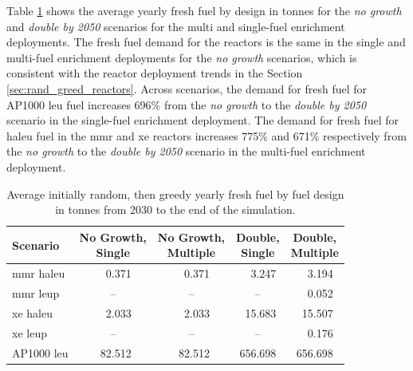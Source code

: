 Table \ref{tab:rand_greed_fresh_avg} shows the average yearly fresh fuel by design in tonnes for the \textit{no growth} and \textit{double by 2050} scenarios for the multi and single-fuel enrichment deployments. The fresh fuel demand for the reactors is the same in the single and multi-fuel enrichment deployments for the \textit{no growth} scenarios, which is consistent with the reactor deployment trends in the Section \ref{sec:rand_greed_reactors}. Across scenarios, the demand for fresh fuel for AP1000 \gls{leu} fuel increases 696\% from the \textit{no growth} to the \textit{double by 2050} scenario in the single-fuel enrichment deployment. The demand for fresh fuel for \gls{haleu} fuel in the \gls{mmr} and \gls{xe} reactors increases 775\% and 671\% respectively from the \textit{no growth} to the \textit{double by 2050} scenario in the multi-fuel enrichment deployment.

\begin{table}[H]
    \centering
    \caption{Average initially random, then greedy yearly fresh fuel by fuel design in tonnes from 2030 to the end of the simulation.}
    \label{tab:rand_greed_fresh_avg}
    \begin{tabular}{l c c c c}
       \toprule
       Scenario & \shortstack{No Growth,\\ Single} & \shortstack{No Growth,\\ Multiple} & \shortstack{Double,\\ Single} & \shortstack{Double,\\ Multiple}  \\
       \midrule
       \gls{mmr} \gls{haleu}   & \textcolor{white}{00}0.371    & \textcolor{white}{00}0.371   & \textcolor{white}{00}3.247    & \textcolor{white}{00}3.194    \\
       \gls{mmr} \gls{leup}    & --       & --      & --       & \textcolor{white}{00}0.052    \\
       \gls{xe} \gls{haleu}    & \textcolor{white}{00}2.033    & \textcolor{white}{00}2.033   & \textcolor{white}{0}15.683   & \textcolor{white}{0}15.507   \\
       \gls{xe} \gls{leup}     & --       & --      & --       & \textcolor{white}{00}0.176    \\
       AP1000 \gls{leu}        & \textcolor{white}{0}82.512   & \textcolor{white}{0}82.512  & 656.698  & 656.698  \\
       \bottomrule
    \end{tabular}
\end{table}


